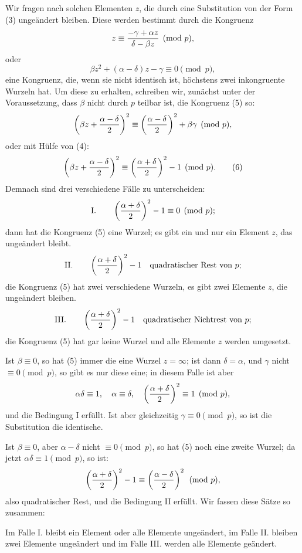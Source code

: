 \documentclass[11pt]{article}
\begin{document}
Wir fragen nach solchen Elementen $z$, die durch eine Substitution von der Form (3) ungeändert bleiben. Diese werden bestimmt durch die Kongruenz
\[
 z\equiv {-\gamma+\alpha z\over \delta-\beta z}\pmod p,
\]
oder
\begin{equation}
 \beta z^2+(\alpha-\delta)z-\gamma\equiv0\pmod p,
\tag{5}
\end{equation}
eine Kongruenz, die, wenn sie nicht identisch ist, höchstens zwei inkongruente Wurzeln hat. Um diese zu erhalten, schreiben wir, zunächst unter der Voraussetzung, dass $\beta$ nicht durch $p$ teilbar ist, die Kongruenz (5) so:
\[
 \left(\beta z+{\alpha-\delta\over2}\right)^2
 \equiv \left({\alpha-\delta\over2}\right)^2+\beta\gamma\pmod p,
\]
oder mit Hülfe von (4):
\begin{equation}
 \left(\beta z+{\alpha-\delta\over2}\right)^2
 \equiv \left({\alpha+\delta\over2}\right)^2-1\pmod p.
\tag{6}
\end{equation}
Demnach sind drei verschiedene Fälle zu unterscheiden:
\[
\text{I.}\qquad
 \left({\alpha+\delta\over2}\right)^2-1\equiv0\pmod p;
\]
dann hat die Kongruenz (5) eine Wurzel; es gibt ein und nur ein Element $z$, das ungeändert bleibt.
\[
\text{II.}\qquad
 \left({\alpha+\delta\over2}\right)^2-1
\quad\text{quadratischer Rest von }p;
\]
die Kongruenz (5) hat zwei verschiedene Wurzeln, es gibt zwei Elemente $z$, die ungeändert bleiben.
\[
\text{III.}\qquad
 \left({\alpha+\delta\over2}\right)^2-1
\quad\text{quadratischer Nichtrest von }p;
\]
die Kongruenz (5) hat gar keine Wurzel und alle Elemente $z$ werden umgesetzt.

Ist $\beta\equiv0$, so hat (5) immer die eine Wurzel $z=\infty$; ist dann $\delta=\alpha$, und $\gamma$ nicht $\equiv0\pmod p$, so gibt es nur diese eine; in diesem Falle ist aber
\[
 \alpha\delta\equiv1,
 \quad \alpha\equiv\delta,
 \quad \left({\alpha+\delta\over2}\right)^2\equiv1\pmod p,
\]
und die Bedingung I erfüllt. Ist aber gleichzeitig $\gamma\equiv0\pmod p$, so ist die Substitution die identische.

Ist $\beta\equiv0$, aber $\alpha-\delta$ nicht $\equiv0\pmod p$, so hat (5) noch eine zweite Wurzel; da jetzt $\alpha\delta\equiv1\pmod p$, so ist:
\[
 \left({\alpha+\delta\over2}\right)^2-1
 \equiv \left({\alpha-\delta\over2}\right)^2\pmod p,
\]
also quadratischer Rest, und die Bedingung II erfüllt. Wir fassen diese Sätze so zusammen:

Im Falle I. bleibt ein Element oder alle Elemente ungeändert, im Falle II. bleiben zwei Elemente ungeändert und im Falle III. werden alle Elemente geändert.
\end{document}
